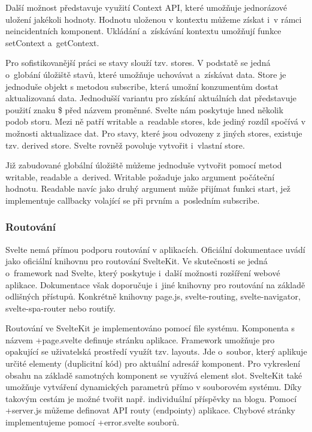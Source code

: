 Další možnost představuje využití Context API, které umožňuje jednorázové uložení jakékoli hodnoty. 
Hodnotu uloženou v kontextu můžeme získat i~v rámci neincidentních komponent. Ukládání a~získávání kontextu umožňují funkce setContext a~getContext.

Pro sofistikovanější práci se stavy slouží tzv. stores. V podstatě se jedná o~globání úložiště stavů, které umožňuje uchovávat a~získávat data. 
Store je jednoduše objekt s metodou subscribe, která umožní konzumentům dostat aktualizovaná data. 
Jednodušší variantu pro získání aktuálních dat představuje použití znaku \$ před názvem proměnné. Svelte nám poskytuje hned několik podob storu. 
Mezi ně patří writable a~readable stores, kde jediný rozdíl spočívá v možnosti aktualizace dat. 
Pro stavy, které jsou odvozeny z jiných stores, existuje tzv. derived store. Svelte rovněž povoluje vytvořit i~vlastní store. 

Již zabudované globální úložiště můžeme jednoduše vytvořit pomocí metod writable, readable a~derived. Writable požaduje jako argument počáteční hodnotu. 
Readable navíc jako druhý argument může přijímat funkci start, jež implementuje callbacky volající se při prvním a~posledním subscribe.\cite{sveltehandbook,svelte,sveltestatemanagement}

\subsubsection{Routování}

Svelte nemá přímou podporu routování v aplikacích. Oficiální dokumentace uvádí jako oficiální knihovnu pro routování SvelteKit. 
Ve skutečnosti se jedná o~framework nad Svelte, který poskytuje i~další možnosti rozšíření webové aplikace. 
Dokumentace však doporučuje i~jiné knihovny pro routování na základě odlišných přístupů. 
Konkrétně knihovny page.js, svelte-routing, svelte-navigator, svelte-spa-router nebo routify.\cite{svelte,svelteforbeginners}

Routování ve SvelteKit je implementováno pomocí file systému. Komponenta s názvem +page.svelte definuje stránku aplikace. 
Framework umožňuje pro opakující se uživatelská prostředí využít tzv. layouts. Jde o~soubor, který aplikuje určité elementy (duplicitní kód) pro aktuální adresář komponent. 
Pro vykreslení obsahu na základě samotných komponent se využívá element slot. SvelteKit také umožňuje vytváření dynamických parametrů přímo v souborovém systému. 
Díky takovým cestám je možné tvořit např. individuální příspěvky na blogu. Pomocí +server.js můžeme definovat API routy (endpointy) aplikace. 
Chybové stránky implementujeme pomocí +error.svelte souborů.\cite{svelte,sveltekit}

